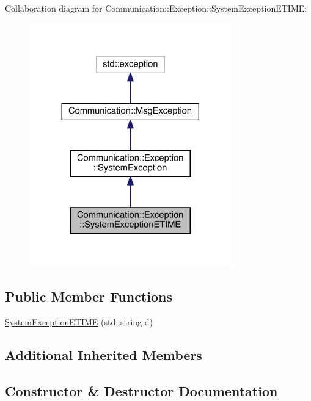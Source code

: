 Collaboration diagram for Communication\+:\+:Exception\+:\+:System\+Exception\+E\+T\+I\+M\+E\+:\nopagebreak
\begin{figure}[H]
\begin{center}
\leavevmode
\includegraphics[width=248pt]{class_communication_1_1_exception_1_1_system_exception_e_t_i_m_e__coll__graph}
\end{center}
\end{figure}
\subsection*{Public Member Functions}
\begin{DoxyCompactItemize}
\item 
\hyperlink{class_communication_1_1_exception_1_1_system_exception_e_t_i_m_e_ac4a7ca5df27965249e2361fe00633877}{System\+Exception\+E\+T\+I\+M\+E} (std\+::string d)
\end{DoxyCompactItemize}
\subsection*{Additional Inherited Members}


\subsection{Constructor \& Destructor Documentation}
\hypertarget{class_communication_1_1_exception_1_1_system_exception_e_t_i_m_e_ac4a7ca5df27965249e2361fe00633877}{}
